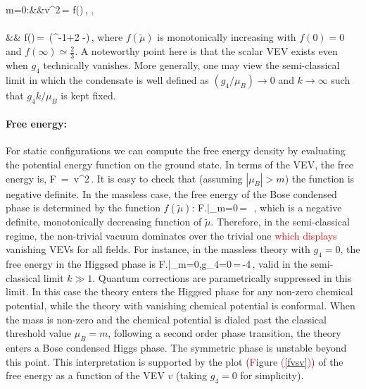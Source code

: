  \bea
 m=0:\qquad &&v^2\,=\,\,f(\tilde\mu)\,,\qquad \tilde\mu\,\equiv\,\textcolor{red}{,}\\\nonumber\\\nonumber
 && f(\tilde\mu)\,=\, \left(\tilde\mu^{-1}+2 -\right)\,,
 \eea
 where $f(\tilde \mu)$ is  monotonically increasing with $f(0)=0$ and $f(\infty)\simeq \frac{2}{3}$. A noteworthy point here is that the scalar VEV exists even when $g_4$  technically vanishes.  More generally, one may view the semi\textcolor{red}{-}classical limit in which the condensate is well defined as  $(g_4/\mu_B)\to 0$ and $k\to\infty$ such that $g_4 k/\mu_B$ is kept fixed.
 
 \paragraph{Free energy:} For static configurations  we can compute the free energy density by evaluating the potential energy function on the ground state.   In terms of the VEV, the free energy is,
 \be
F \,=\, v^2\,.
 \ee
 It is easy to check that (assuming $|\mu_B| > m$) the function is negative definite.
 In the massless case, the free energy of the Bose condensed phase is determined by the function $f(\tilde\mu)$:
 \be
 F\left.\right|_{m=0}\,=\, \,,
 \ee
 which is a negative definite, monotonically decreasing function of $\tilde\mu$. Therefore, in the semi\textcolor{red}{-}classical regime, the non\textcolor{red}{-}trivial vacuum dominates over the trivial one \textcolor{red}{which displays} vanishing VEVs for all fields. For instance, in the massless theory with $g_4=0$, the free energy in the Higgsed phase is
 \be
 F\left.\right|_{m=0,g_4=0}\,=\,-4\,,
 \ee
  valid in the semi\textcolor{red}{-}classical limit $k\gg 1$. Quantum corrections are parametrically suppressed in this limit. In this case the theory enters the Higgsed phase for any non-zero chemical potential, while the theory with vanishing chemical potential is conformal.   When the mass is non-zero and the chemical potential is dialed past the classical threshold value $\mu_B=m$, following a second order phase transition, the theory enters a Bose condensed Higgs phase.   The symmetric phase is unstable beyond this point. This interpretation is supported by the plot (\textcolor{red}{F}igure \textcolor{red}{(}\ref{fvsv}\textcolor{red}{)}) of the free energy as a function of the VEV $v$ (taking $g_4=0$ for simplicity). \colorbox{red}{ }
